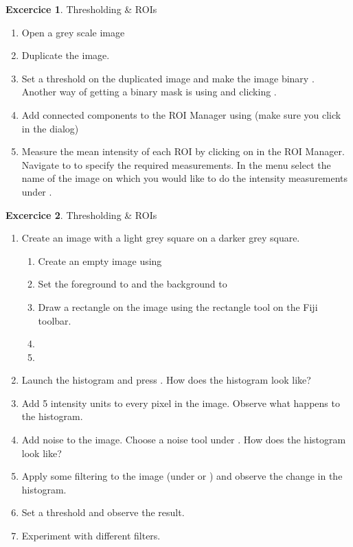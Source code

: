 \documentclass[xcolor=table,DIV=19,twocolumn]{scrartcl}
\theoremstyle{definition}
\newtheorem{exercice}{Excercice}
\begin{document}
\begin{exercice} Thresholding \& ROIs
  \begin{enumerate}
  \item Open a grey scale image
  \item Duplicate the image.
  \item Set a threshold on the duplicated image and make the image binary . Another way of getting a binary mask is using  and clicking . 
  \item Add connected components to the ROI Manager using  (make sure you click  in the  dialog)
  \item Measure the mean intensity of each ROI by clicking on  in the ROI Manager. Navigate to  to specify the required measurements. In the  menu select the name of the image on which you would like to do the intensity measurements under .
  
  \end{enumerate}
\end{exercice}

\begin{exercice} Thresholding \& ROIs
  \begin{enumerate}
     \item Create an image with a light grey square on a darker grey
      square.
      \begin{enumerate}
          \item Create an empty image using 
          \item {} Set the foreground to  and the background to 
          \item Draw a rectangle on the image using the rectangle tool on the Fiji toolbar.
          \item {}
          \item {}
        \end{enumerate}
      \item Launch the histogram and press . How does the histogram look like?
      \item Add 5 intensity units to every pixel in the image.   Observe what happens to the histogram.
      \item Add noise to the image. Choose a noise tool under   . How does the histogram look like?
    \item Apply some filtering to the image (under  or ) and observe the change in the histogram.
    \item Set a threshold and observe the result.
    \item  Experiment with different filters.
  \end{enumerate}
\end{exercice}
\end{document}
